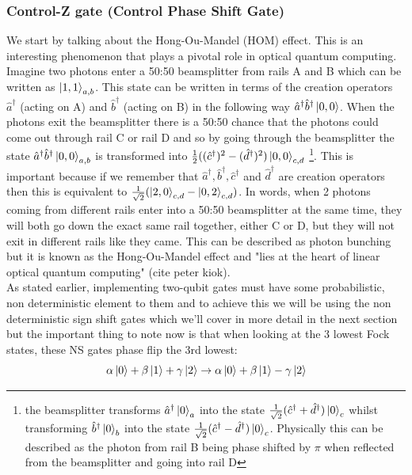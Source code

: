 \subsubsection{Control-Z gate (Control Phase Shift Gate)}
We start by talking about the Hong-Ou-Mandel (HOM) effect. This is an interesting phenomenon that plays a pivotal role in optical quantum computing. Imagine two photons enter a 50:50 beamsplitter from rails A and B which can be written as $\ket{1,1}_{a,b}$. This state can be written in terms of the creation operators $\hat{a}^\dagger$ (acting on A) and $\hat{b}^\dagger$ (acting on B) in the following way $\hat{a}^\dagger\hat{b}^\dagger\ket{0,0}$. When the photons exit the beamsplitter there is a 50:50 chance that the photons could come out through rail C or rail D and so by going through the beamsplitter the state $\hat{a}^\dagger\hat{b}^\dagger\ket{0,0}_{a,b}$ is transformed into $\frac{1}{2}((\hat{c}^\dagger)^2 - (\hat{d}^\dagger)^2)\ket{0,0}_{c,d}$ \footnote{ the beamsplitter transforms $\hat{a}^\dagger\ket{0}_a$ into the state $\frac{1}{\sqrt{2}}(\hat{c}^\dagger + \hat{d}^\dagger)\ket{0}_c$ whilst transforming  $\hat{b}^\dagger\ket{0}_b$ into the state $\frac{1}{\sqrt{2}}(\hat{c}^\dagger - \hat{d}^\dagger)\ket{0}_c$. Physically this can be described as the photon from rail B being phase shifted by $\pi$ when reflected from the beamsplitter and going into rail D}. This is important because if we remember that $\hat{a}^\dagger, \hat{b}^\dagger, \hat{c}^\dagger$ and $\hat{d}^\dagger$ are creation operators then this is equivalent to $\frac{1}{\sqrt{2}}(\ket{2,0}_{c,d} - \ket{0,2}_{c,d})$. In words, when 2 photons coming from different rails enter into a 50:50 beamsplitter at the same time, they will both go down the exact same rail together, either C or D, but they will not exit in different rails like they came. This can be described as photon bunching but it is known as the Hong-Ou-Mandel effect and "lies at the heart of linear optical quantum computing" (cite peter kiok). \\
As stated earlier, implementing two-qubit gates must have some probabilistic, non deterministic element to them and to achieve this we will be using the non deterministic sign shift gates which we'll cover in more detail in the next section but the important thing to note now is that when looking at the 3 lowest Fock states, these NS gates phase flip the 3rd lowest:
\begin{equation} \label{NS evolution}
    \alpha\ket{0} + \beta\ket{1} + \gamma\ket{2} \rightarrow \alpha\ket{0} + \beta\ket{1} - \gamma\ket{2}
\end{equation}


